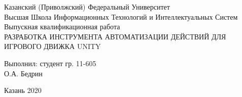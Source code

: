 \begin{center} 

\large Казанский (Приволжский) Федеральный Университет \\ Высшая Школа Информационных Технологий и Интеллектуальных Систем\\[5.5cm] 

\huge Выпускная квалификационная работа\\[0.6cm] %
\large РАЗРАБОТКА ИНСТРУМЕНТА АВТОМАТИЗАЦИИ ДЕЙСТВИЙ ДЛЯ ИГРОВОГО ДВИЖКА UNITY \\[3.7cm]


\end{center} 

\begin{flushright}
Выполнил: студент гр. 11-605 \\
О.А. Бедрин \\
\end{flushright}


\vfill 

\begin{center} 
\large Казань 2020
\end{center} 

\thispagestyle{empty}